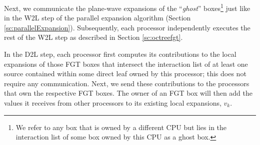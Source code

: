 
 Next, we communicate the plane-wave expansions of the ``{\em ghost}'' boxes\footnote{We refer to any box that
 is owned by a different CPU but lies in the interaction list of some box owned by this CPU as a ghost box.} just
 like in the W2L step of the parallel expansion algorithm (Section \ref{sc:parallelExpansion}). Subsequently, each processor 
 independently executes the rest of the W2L step as described in Section \ref{sc:octreefgt}.

In the D2L step, each processor first computes its contributions to the local expansions of those FGT boxes that intersect
 the interaction list of at least one source contained within some direct leaf owned by this processor; this does not 
 require any communication. Next, we send these contributions to the processors that own the respective FGT boxes. The owner of
an FGT box will then add the values it receives from other processors to its existing local expansions, $v_k$.

